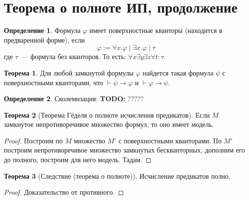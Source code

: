 \documentclass[a4paper,11pt]{article}
\theoremstyle{definition}
\newtheorem*{thm}{Теорема}
\newtheorem*{dfn}{Определение}
\newcommand{\proves}{\vdash}
\newcommand{\todo}[1]{\textbf{TODO:} #1}
\begin{document}
\section{Теорема о полноте ИП, продолжение}
\begin{dfn}
Формула $\varphi$ имеет поверхностные кванторы (находится в предваренной форме),
если
\[ \varphi := \forall x.\varphi \mid \exists x.\varphi \mid \tau \]
где $\tau$~--- формула без кванторов. То есть: $\forall x\exists y\exists
z\forall t : \tau$.
\end{dfn}
\begin{thm}
Для любой замкнутой формулы $\varphi$ найдется такая формула $\psi$ с
поверхностными кванторами, что $\proves \psi \to \varphi$ и $\proves \varphi \to
\psi$.
\end{thm}
\begin{dfn}
Сколемизация: \todo{?????}
\end{dfn}
\begin{thm}[Теорема Гёделя о полноте исчисления предикатов]
Если $M$ замкнутое непротиворечивое множество формул, то оно имеет модель.
\end{thm}
\begin{proof}
Построим по $M$ множество $M'$ с поверхностными кванторами. По $M'$ построим
непротиворечивое множество замкнутых бескванторных, дополним его до полного,
построим для него модель. Тадам.
\end{proof}
\begin{thm}[Следствие (теорема о полноте)]
Исчисление предикатов полно.
\end{thm}
\begin{proof}
Доказательство от противного.
\end{proof}
\end{document}
